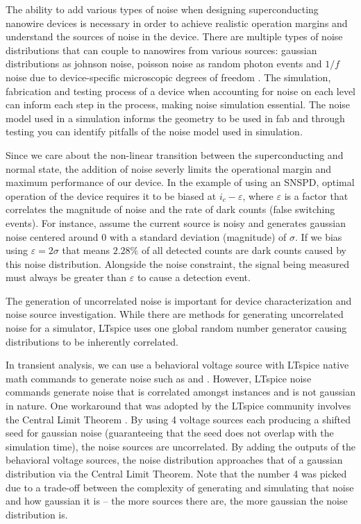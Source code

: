 The ability to add various types of noise when designing superconducting nanowire devices is necessary in order to achieve realistic operation margins and understand the sources of noise in the device. There are multiple types of noise distributions that can couple to nanowires from various sources: gaussian distributions as johnson noise, poisson noise
as random photon events and $1/f$ noise due to device-specific microscopic degrees of freedom \cite{1overfinsc}. The simulation, fabrication and testing process of a device
when accounting for noise on each level can inform each step in the process, making noise
simulation essential. The noise model used in a simulation informs the geometry to be 
used in fab and through testing you can identify pitfalls of the noise model used
in simulation.


Since we care about the non-linear transition between
the superconducting and normal state, the addition of noise severly limits the operational margin and
maximum performance of our device. In the example of using an SNSPD, optimal operation of the device 
requires it to be biased at $i_c-\varepsilon$, where $\varepsilon$ is a factor that correlates the 
magnitude of noise and the rate of dark counts (false switching events). For instance, assume the current source is noisy and generates
gaussian noise centered around $0$ with a standard deviation (magnitude) of $\sigma$.
If we bias using $\varepsilon = 2\sigma$ that means $2.28\%$ of all detected counts are dark counts caused by this noise distribution.
Alongside the noise constraint, the signal being measured 
must always be greater than $\varepsilon$ to cause a detection event.

The generation of uncorrelated noise is important for device characterization and
noise source investigation.
While there are methods for generating uncorrelated noise for a simulator, 
LTspice uses one global random number generator causing distributions to be 
inherently correlated.

In transient analysis, we can use a behavioral voltage source with LTspice native math commands
to generate noise such as  and . However, LTspice noise commands
generate noise that is correlated amongst instances and is not gaussian in nature. One workaround that was
adopted by the LTspice community involves the Central Limit Theorem \cite{CLM-ltspice}. By using 4 voltage sources each producing a shifted seed for 
gaussian noise (guaranteeing that the seed does not overlap with the simulation time),
the noise sources are uncorrelated. By adding the
outputs of the behavioral voltage sources, the noise distribution approaches that of
a gaussian distribution via the Central Limit Theorem. Note that the number 4 was picked due to a trade-off between the complexity of generating and simulating
that noise and how gaussian it is -- the more sources there are, the more gaussian the noise distribution is.

